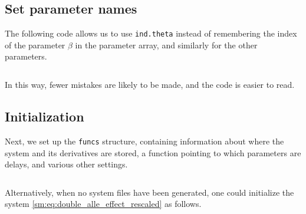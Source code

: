 \subsection{Set parameter names}
The following code allows us to use
\texttt{ind.theta} instead of remembering the
index of the parameter $\beta$ in the parameter array, and similarly for the
other parameters.
\inputminted[firstline=27, lastline=30]{MATLAB}{\pathToDDEBifToolDemos/predator_prey/predator_prey.m}
In this way, fewer mistakes are likely to be made, and the code is easier to read.

\subsection{Initialization}
Next, we set up the \texttt{funcs} structure, containing information about
where the system and its derivatives are stored, a function pointing to which
parameters are delays, and various other settings.
\inputminted[firstline=32, lastline=35]{MATLAB}{\pathToDDEBifToolDemos/predator_prey/predator_prey.m}
Alternatively, when no system files have been generated, one could initialize
the system \cref{sm:eq:double_alle_effect_rescaled} as follows.

